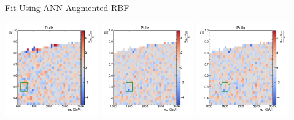 \documentclass[10pt]{beamer}
\begin{document}
\begin{frame}{Fit Using ANN Augmented RBF}
  \begin{center}
    \includegraphics[width=0.3\textwidth]{figures/2dpullplots/nnrbf_32_16_8/E_1200_0p5_100_0p05.pdf} 
    \includegraphics[width=0.3\textwidth]{figures/2dpullplots/nnrbf_32_16_8/E_1500_0p5_100_0p05.pdf} 
    \includegraphics[width=0.3\textwidth]{figures/2dpullplots/nnrbf_32_16_8/E_1500_0p5_150_0p05.pdf} 
  \end{center}


\end{frame}
\end{document}
